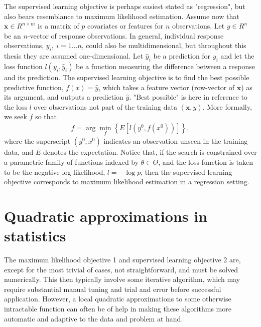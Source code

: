 The supervised learning objective is perhaps easiest stated as "regression", but also bears resemblance to maximum likelihood estimation.
Assume now that $\mathbf{x}\in R^{n\times m}$ is a matrix of $p$ covariates or features for $n$ observations. Let $y\in R^n$ be an $n$-vector of response observations.
In general, individual response observations, $y_i,~i=1\dots n$, could also be multidimensional, but throughout this thesis they are assumed one-dimensional.
Let $\hat{y}_i$ be a prediction for $y_i$ and let the loss function $l(y_i,\hat{y}_i)$ be a function measuring the difference between a response and its prediction.
The supervised learning objective is to find the best possible predictive function, $f(x)=\hat{y}$, which takes a feature vector (row-vector of $\mathbf{x}$) as its argument, and outputs a prediction $\hat{y}$. "Best possible" is here in reference to the loss $l$ over observations not part of the training data $(\mathbf{x},y)$.
More formally, we seek $f$ so that
\begin{align}
	\hat{f} = \arg\min_f \left\{ E\left[l(y^0, f(x^0))\right] \right\},
\end{align} 
where the superscript $(y^0, x^0)$ indicates an observation unseen in the training data, and $E$ denotes the expectation.
Notice that, if the search is constrained over a parametric family of functions indexed by $\theta\in\Theta$, and the loss function is taken to be the negative log-likelihood, $l=-\log p$, then the supervised learning objective corresponds to maximum likelihood estimation in a regression setting.


\chapter{Quadratic approximations in statistics} 


The maximum likelihood objective 1 and supervised learning objective 2 are, except for the most trivial of cases, not straightforward, and must be solved numerically.
This then typically involve some iterative algorithm, which may require substantial manual tuning and trial and error before successful application. 
However, a local quadratic approximations to some otherwise intractable function can often be of help in making these algorithms more automatic and adaptive to the data and problem at hand.

